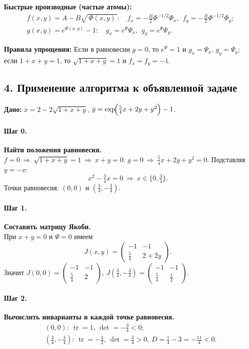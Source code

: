 \textbf{Быстрые производные (частые атомы):}
\[
\begin{aligned}
&f(x,y)=A-B\sqrt{\,\Phi(x,y)\,}\!:\quad
f_x=-\frac{B}{2}\Phi^{-1/2}\Phi_x,\ \ f_y=-\frac{B}{2}\Phi^{-1/2}\Phi_y;\\
&g(x,y)=e^{\Psi(x,y)}-1:\quad g_x=e^{\Psi}\Psi_x,\ \ g_y=e^{\Psi}\Psi_y.
\end{aligned}
\]

\textbf{Правила упрощения:} Если в равновесии \(g=0\), то \(e^{\Psi}=1\) и \(g_x=\Psi_x\), \(g_y=\Psi_y\); если \(1+x+y=1\), то \(\sqrt{1+x+y}=1\) и \(f_x=f_y=-1\).

\subsection*{4. Применение алгоритма к объявленной задаче}

\textbf{Дано:} \(\dot{x}=2-2\sqrt{1+x+y}\), \(\dot{y}=\exp\!\Bigl(\tfrac{5}{4}x+2y+y^{2}\Bigr)-1\).

\paragraph{Шаг 0.} \textbf{Найти положения равновесия.}\\
\(f=0\ \Rightarrow\ \sqrt{1+x+y}=1\ \Rightarrow\ x+y=0\). \quad
\(g=0\ \Rightarrow\ \tfrac{5}{4}x+2y+y^2=0\). Подставляя \(y=-x\):
\[
x^2-\tfrac{3}{4}x=0\ \Rightarrow\ x\in\{0,\tfrac{3}{4}\}.
\]
Точки равновесия: \((0,0)\) и \((\tfrac{3}{4},-\tfrac{3}{4})\).

\paragraph{Шаг 1.} \textbf{Составить матрицу Якоби.}\\
При \(x+y=0\) и \(\Psi=0\) имеем
\[
J(x,y)=
\begin{pmatrix}
-1 & -1\\[2pt]
\tfrac{5}{4} & 2+2y
\end{pmatrix}.
\]
Значит \(J(0,0)=\begin{pmatrix}-1&-1\\[2pt]\tfrac{5}{4}&2\end{pmatrix}\), \(J(\tfrac{3}{4},-\tfrac{3}{4})=\begin{pmatrix}-1&-1\\[2pt]\tfrac{5}{4}&\tfrac{1}{2}\end{pmatrix}\).

\paragraph{Шаг 2.} \textbf{Вычислить инварианты в каждой точке равновесия.}\\
\[
\begin{aligned}
&(0,0):\ \operatorname{tr}=1,\ \det=-\tfrac{3}{4}<0;\\
&(\tfrac{3}{4},-\tfrac{3}{4}):\ \operatorname{tr}=-\tfrac{1}{2},\ \det=\tfrac{3}{4}>0,\ 
D=\tfrac{1}{4}-3=-\tfrac{11}{4}<0.
\end{aligned}
\]

